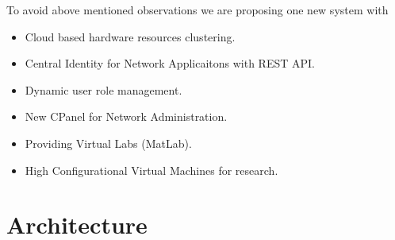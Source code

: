 \documentclass[12pt]{report}
\begin{document}
	To avoid above mentioned observations we are proposing one new system with 
	\begin{itemize}
		\item Cloud based hardware resources clustering.
		\item Central Identity for Network Applicaitons with REST API.
		\item Dynamic user role management.
		\item New CPanel for Network Administration.
		\item Providing Virtual Labs (MatLab).
		\item High Configurational Virtual Machines for research.
	\end{itemize}

\chapter{Architecture}
%
%
%
\end{document}
